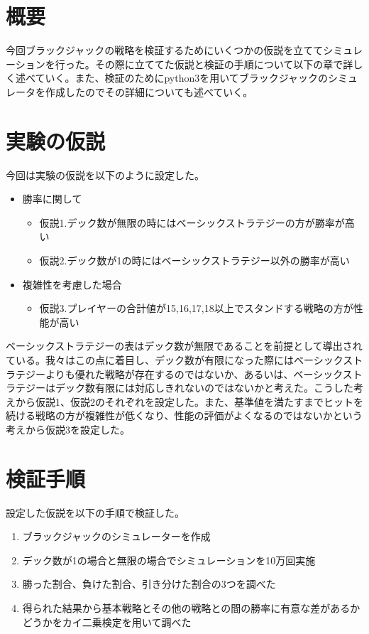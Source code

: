 \section{概要}
今回ブラックジャックの戦略を検証するためにいくつかの仮説を立ててシミュレーションを行った。その際に立ててた仮説と検証の手順について以下の章で詳しく述べていく。また、検証のためにpython3を用いてブラックジャックのシミュレータを作成したのでその詳細についても述べていく。


\section{実験の仮説}
今回は実験の仮説を以下のように設定した。
\begin{itemize}
\item 勝率に関して
    \begin{itemize}
        \item 仮説1.デック数が無限の時にはベーシックストラテジーの方が勝率が高い
        \item 仮説2.デック数が1の時にはベーシックストラテジー以外の勝率が高い
    \end{itemize}
\item 複雑性を考慮した場合
    \begin{itemize}
        \item 仮説3.プレイヤーの合計値が15,16,17,18以上でスタンドする戦略の方が性能が高い
    \end{itemize}
\end{itemize}
ベーシックストラテジーの表はデック数が無限であることを前提として導出されている。我々はこの点に着目し、デック数が有限になった際にはベーシックストラテジーよりも優れた戦略が存在するのではないか、あるいは、ベーシックストラテジーはデック数有限には対応しきれないのではないかと考えた。こうした考えから仮説1、仮説2のそれぞれを設定した。また、基準値を満たすまでヒットを続ける戦略の方が複雑性が低くなり、性能の評価がよくなるのではないかという考えから仮説3を設定した。

\section{検証手順}
設定した仮説を以下の手順で検証した。
\begin{enumerate}
\item ブラックジャックのシミュレーターを作成
\item デック数が1の場合と無限の場合でシミュレーションを10万回実施
\item 勝った割合、負けた割合、引き分けた割合の3つを調べた
\item 得られた結果から基本戦略とその他の戦略との間の勝率に有意な差があるかどうかをカイ二乗検定を用いて調べた
\end{enumerate}

